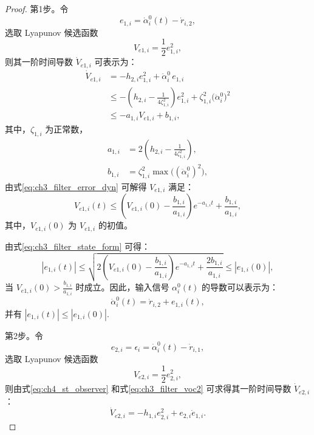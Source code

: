 \begin{proof}
第1步。令
\begin{equation}
e_{1,i}=\dot\alpha_i^0(t)-\dot r_{i,2},
\end{equation}
选取 Lyapunov 候选函数
\begin{equation}
V_{e1,i}=\frac{1}{2}e_{1,i}^2,
\end{equation}
则其一阶时间导数 $\dot V_{e1,i}$ 可表示为：
\begin{equation}\label{eq:ch3_filter_error_dyn}
\begin{aligned}
\dot V_{e1,i}
&=-h_{2,i}e_{1,i}^2+\ddot\alpha_i^0\,e_{1,i}\\
&\le -\left(h_{2,i}-\frac{1}{4\zeta_{1,i}^2}\right)e_{1,i}^2+\zeta_{1,i}^2\bigl(\ddot\alpha_i^0\bigr)^2\\
&\le -a_{1,i}V_{e1,i}+b_{1,i},
\end{aligned}
\end{equation}
其中，$\zeta_{1,i}$ 为正常数，
\begin{subequations}
\begin{align}
a_{1,i}&=2\left(h_{2,i}-\frac{1}{4\zeta_{1,i}^2}\right),\\
b_{1,i}&=\zeta_{1,i}^2\max\bigl((\ddot\alpha_i^0)^2\bigr),
\end{align}
\end{subequations}
由式\eqref{eq:ch3_filter_error_dyn} 可解得 $V_{e1,i}$ 满足：
\begin{equation}\label{eq:ch3_filter_state_form}
V_{e1,i}(t)\le
\left(V_{e1,i}(0)-\frac{b_{1,i}}{a_{1,i}}\right)e^{-a_{1,i}t}
+\frac{b_{1,i}}{a_{1,i}},
\end{equation}
其中，$V_{e1,i}(0)$ 为 $V_{e1,i}$ 的初值。

由式\eqref{eq:ch3_filter_state_form} 可得：
\begin{equation}\label{eq:ch3_filter_voc}
\left|e_{1,i}(t)\right|
\le
\sqrt{2\left(V_{e1,i}(0)-\frac{b_{1,i}}{a_{1,i}}\right)e^{-a_{1,i}t}+\frac{2b_{1,i}}{a_{1,i}}}
\le |e_{1,i}(0)|,
\end{equation}
当 $V_{e1,i}(0)>\frac{b_{1,i}}{a_{1,i}}$ 时成立。因此，输入信号 $\alpha_i^0(t)$ 的导数可以表示为：
\begin{equation}\label{eq:ch3_filter_voc2}
\dot\alpha_i^0(t)=\dot r_{i,2}+e_{1,i}(t),
\end{equation}
并有 $|e_{1,i}(t)|\le |e_{1,i}(0)|$.

第2步。令
\begin{equation}
e_{2,i}=\epsilon_i=\dot\alpha_i^0(t)-\dot r_{i,1},
\end{equation}
选取 Lyapunov 候选函数
\begin{equation}
V_{e2,i}=\frac{1}{2}e_{2,i}^2,
\end{equation}
则由式\eqref{eq:ch4_st_observer} 和式\eqref{eq:ch3_filter_voc2} 可求得其一阶时间导数 $\dot V_{e2,i}$：
\begin{equation}\label{eq:ch3_filter_e2dot}
\dot V_{e2,i}=-h_{1,i}e_{2,i}^2+e_{2,i}\dot e_{1,i}.
\end{equation}


\end{proof}
